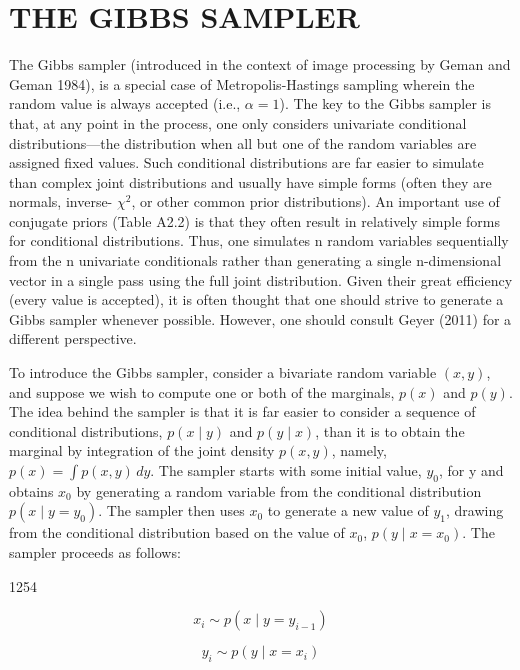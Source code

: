\documentclass{article}
\begin{document}
\section{THE GIBBS SAMPLER}
The Gibbs sampler (introduced in the context of image processing by Geman and Geman 1984), is a special case of Metropolis-Hastings sampling wherein the random value is always accepted (i.e.,  $ \alpha = 1 $). The key to the Gibbs sampler is that, at any point in the process, one only considers univariate conditional distributions—the distribution when all but one of the random variables are assigned fixed values. Such conditional distributions are far easier to simulate than complex joint distributions and usually have simple forms (often they are normals, inverse- $ \chi^{2} $, or other common prior distributions). An important use of conjugate priors (Table A2.2) is that they often result in relatively simple forms for conditional distributions. Thus, one simulates n random variables sequentially from the n univariate conditionals rather than generating a single n-dimensional vector in a single pass using the full joint distribution. Given their great efficiency (every value is accepted), it is often thought that one should strive to generate a Gibbs sampler whenever possible. However, one should consult Geyer (2011) for a different perspective.

To introduce the Gibbs sampler, consider a bivariate random variable  $ (x, y) $, and suppose we wish to compute one or both of the marginals,  $ p(x) $ and  $ p(y) $. The idea behind the sampler is that it is far easier to consider a sequence of conditional distributions,  $ p(x \mid y) $ and  $ p(y \mid x) $, than it is to obtain the marginal by integration of the joint density  $ p(x, y) $, namely,  $ p(x) = \int p(x, y) \, dy $. The sampler starts with some initial value,  $ y_0 $, for y and obtains  $ x_0 $ by generating a random variable from the conditional distribution  $ p(x \mid y = y_0) $. The sampler then uses  $ x_0 $ to generate a new value of  $ y_1 $, drawing from the conditional distribution based on the value of  $ x_0 $,  $ p(y \mid x = x_0) $. The sampler proceeds as follows:

1254

\begin{equation}
x_{i}\sim p(x\mid y=y_{i-1})
\end{equation}

\begin{equation}
y_{i}\sim p(y\mid x=x_{i})
\end{equation}
\end{document}
